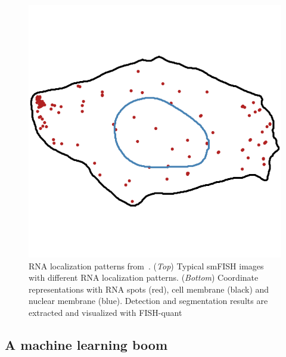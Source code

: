 \begin{figure}[]
		\includegraphics[width=0.95\linewidth]{figures/introduction/real_coord_protrusion}
	\endminipage
	\caption[RNA localization patterns: from pixels to numbers]{RNA localization patterns from~\cite{pointfish_2022}.
	(\textit{Top}) Typical smFISH images with different RNA localization patterns.
	(\textit{Bottom}) Coordinate representations with RNA spots (red), cell membrane (black) and nuclear membrane (blue).
	Detection and segmentation results are extracted and visualized with FISH-quant~\cite{Imbert_fq_2022}}
	\label{fig:intro_localization_patterns}
\end{figure}

\subsection{A machine learning boom}
\label{subsec:intro_ml_tools}





